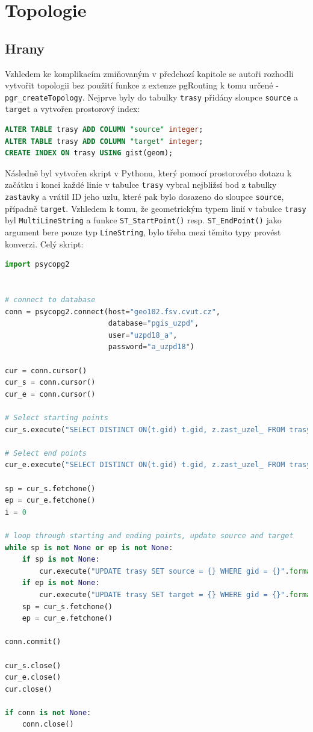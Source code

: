\documentclass[a4paper, 12pt]{article}
\begin{document}
\section{Topologie}
\subsection{Hrany}
Vzhledem ke komplikacím zmiňovaným v předchozí kapitole se autoři rozhodli vytvořit topologii bez použití funkce z extenze pgRouting k tomu určené -  \texttt{pgr\_createTopology}. Nejprve byly do tabulky \texttt{trasy} přidány sloupce \texttt{source} a \texttt{target} a vytvořen prostorový index: 
\begin{lstlisting}[language=sql]
ALTER TABLE trasy ADD COLUMN "source" integer;
ALTER TABLE trasy ADD COLUMN "target" integer;
CREATE INDEX ON trasy USING gist(geom);
\end{lstlisting} 

Následně byl vytvořen skript v Pythonu, který pomocí prostorového dotazu k začátku i konci každé linie v tabulce \texttt{trasy} vybral nejbližsí bod z tabulky \texttt{zastavky} a vrátil ID jeho uzlu, které pak bylo dosazeno do sloupce \texttt{source}, případně \texttt{target}. Vzhledem k tomu, že geometrickým typem linií v tabulce \texttt{trasy} byl \texttt{MultiLineString} a funkce \texttt{ST\_StartPoint()} resp. \texttt{ST\_EndPoint()} jako argument bere pouze typ \texttt{LineString}, bylo třeba mezi těmito typy provést konverzi.
\newpage
Celý skript:
\begin{lstlisting}[language=python]
import psycopg2


# connect to database
conn = psycopg2.connect(host="geo102.fsv.cvut.cz",
						database="pgis_uzpd",
						user="uzpd18_a",
						password="a_uzpd18")

cur = conn.cursor()
cur_s = conn.cursor()
cur_e = conn.cursor()

# Select starting points
cur_s.execute("SELECT DISTINCT ON(t.gid) t.gid, z.zast_uzel_ FROM trasy t, zastavky z WHERE ST_DWithin(ST_StartPoint(ST_LineMerge(t.geom)), z.geom, 500) AND t.zast_id_od = z.zast_id")

# Select end points
cur_e.execute("SELECT DISTINCT ON(t.gid) t.gid, z.zast_uzel_ FROM trasy t, zastavky z WHERE ST_DWithin(ST_EndPoint(ST_LineMerge(t.geom)), z.geom, 500) AND t.zast_id_ka = z.zast_id")

sp = cur_s.fetchone()
ep = cur_e.fetchone()
i = 0

# loop through starting and ending points, update source and target
while sp is not None or ep is not None:
	if sp is not None:
		cur.execute("UPDATE trasy SET source = {} WHERE gid = {}".format(sp[1],sp[0]))
	if ep is not None:
		cur.execute("UPDATE trasy SET target = {} WHERE gid = {}".format(ep[1],ep[0]))
	sp = cur_s.fetchone()
	ep = cur_e.fetchone()		

conn.commit()

cur_s.close()
cur_e.close()
cur.close()

if conn is not None:
	conn.close()
\end{lstlisting}
\end{document}

